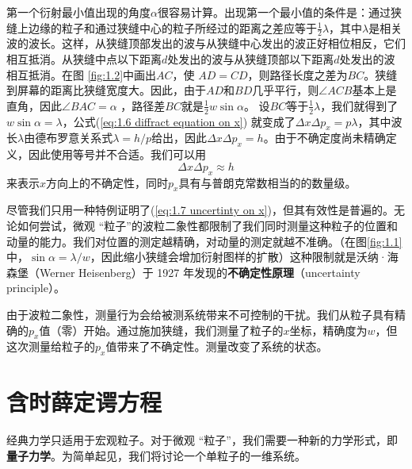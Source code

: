 	
	第一个衍射最小值出现的角度$\alpha$很容易计算。出现第一个最小值的条件是：通过狭缝上边缘的粒子和通过狭缝中心的粒子所经过的距离之差应等于$\frac{1}{2}\lambda$，其中$\lambda$是相关波的波长。这样，从狭缝顶部发出的波与从狭缝中心发出的波正好相位相反，它们相互抵消。从狭缝中点以下距离$d$处发出的波与从狭缝顶部以下距离$d$处发出的波相互抵消。在图 \ref{fig:1.2}中画出$AC$，使 $AD=CD$，则路径长度之差为$BC$。狭缝到屏幕的距离比狭缝宽度大。因此，由于$AD$和$BD$几乎平行，则$\angle ACB$基本上是直角，因此$\angle BAC = \alpha$ ，路径差$BC$就是$\frac{1}{2}w \sin \alpha$。 设$BC$等于$\frac{1}{2}\lambda$，我们就得到了$w\sin\alpha=\lambda$，公式(\ref{eq:1.6 diffract equation on x}) 就变成了$\Delta x \Delta p_x=p\lambda$，其中波长$\lambda$由德布罗意关系式$\lambda=h/p$给出，因此$\Delta x \Delta p_x=h$。由于不确定度尚未精确定义，因此使用等号并不合适。我们可以用 
	\begin{equation}
		\Delta x \Delta p_x \approx h
		\label{eq:1.7 uncertinty on x}
	\end{equation}
	来表示$x$方向上的不确定性，同时$p_x$具有与普朗克常数相当的的数量级。

	尽管我们只用一种特例证明了(\ref{eq:1.7 uncertinty on x})，但其有效性是普遍的。无论如何尝试，微观 “粒子”的波粒二象性都限制了我们同时测量这种粒子的位置和动量的能力。我们对位置的测定越精确，对动量的测定就越不准确。（在图\ref{fig:1.1}中，$\sin \alpha = \lambda / w$，因此缩小狭缝会增加衍射图样的扩散）这种限制就是沃纳·海森堡（Werner Heisenberg）于 1927 年发现的\textbf{不确定性原理}（uncertainty principle）。

	由于波粒二象性，测量行为会给被测系统带来不可控制的干扰。我们从粒子具有精确的$p_x$值（零）开始。通过施加狭缝，我们测量了粒子的$x$坐标，精确度为$w$，但这次测量给粒子的$p_x$值带来了不确定性。测量改变了系统的状态。
	
	
\section{含时薛定谔方程}
\label{sec:1.4 The Time-Dependent Schrödinger Equation}

	经典力学只适用于宏观粒子。对于微观 “粒子”，我们需要一种新的力学形式，即\textbf{量子力学}。为简单起见，我们将讨论一个单粒子的一维系统。

